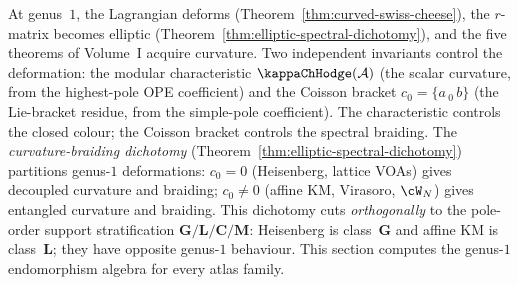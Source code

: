 At genus~$1$, the Lagrangian deforms
(Theorem~\ref{thm:curved-swiss-cheese}), the $r$-matrix
becomes elliptic
(Theorem~\ref{thm:elliptic-spectral-dichotomy}), and the
five theorems of Volume~I acquire curvature. Two
independent invariants control the deformation: the modular
characteristic $\kappaChHodge(\cA)$ (the scalar curvature, from the
highest-pole OPE coefficient) and the Coisson bracket
$c_0 = \{a \,{}_0\, b\}$ (the Lie-bracket residue, from the
simple-pole coefficient). The characteristic controls the
closed colour; the Coisson bracket controls the spectral
braiding. The \emph{curvature-braiding dichotomy}
(Theorem~\ref{thm:elliptic-spectral-dichotomy}) partitions
genus-$1$ deformations: $c_0 = 0$ (Heisenberg, lattice VOAs)
gives decoupled curvature and braiding; $c_0 \ne 0$ (affine KM,
Virasoro, $\cW_N$) gives entangled curvature and braiding.
This dichotomy cuts \emph{orthogonally} to the pole-order
support stratification $\mathbf{G}/\mathbf{L}/\mathbf{C}/\mathbf{M}$:
Heisenberg is class~$\mathbf{G}$ and affine KM is class~$\mathbf{L}$;
they have opposite genus-$1$ behaviour. This section computes the genus-$1$
endomorphism algebra for every atlas family.

